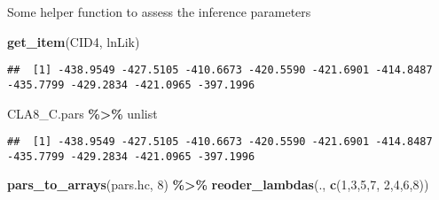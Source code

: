 \documentclass[
]{article}
\newenvironment{Shaded}{\begin{snugshade}}{\end{snugshade}}
\newcommand{\DecValTok}[1]{\textcolor[rgb]{0.00,0.00,0.81}{#1}}
\newcommand{\FunctionTok}[1]{\textcolor[rgb]{0.13,0.29,0.53}{\textbf{#1}}}
\newcommand{\NormalTok}[1]{#1}
\newcommand{\SpecialCharTok}[1]{\textcolor[rgb]{0.81,0.36,0.00}{\textbf{#1}}}
\newcommand{\StringTok}[1]{\textcolor[rgb]{0.31,0.60,0.02}{#1}}
\begin{document}
Some helper function to assess the inference parameters

\begin{Shaded}
\begin{Highlighting}[]
\FunctionTok{get\_item}\NormalTok{(CID4, }\StringTok{\textquotesingle{}lnLik\textquotesingle{}}\NormalTok{)}
\end{Highlighting}
\end{Shaded}

\begin{verbatim}
##  [1] -438.9549 -427.5105 -410.6673 -420.5590 -421.6901 -414.8487 -435.7799 -429.2834 -421.0965 -397.1996
\end{verbatim}

\begin{Shaded}
\begin{Highlighting}[]
\NormalTok{CLA8\_C.pars }\SpecialCharTok{\%\textgreater{}\%}\NormalTok{ unlist}
\end{Highlighting}
\end{Shaded}

\begin{verbatim}
##  [1] -438.9549 -427.5105 -410.6673 -420.5590 -421.6901 -414.8487 -435.7799 -429.2834 -421.0965 -397.1996
\end{verbatim}

\begin{Shaded}
\begin{Highlighting}[]
\FunctionTok{pars\_to\_arrays}\NormalTok{(pars.hc, }\DecValTok{8}\NormalTok{) }\SpecialCharTok{\%\textgreater{}\%} \FunctionTok{reoder\_lambdas}\NormalTok{(., }\FunctionTok{c}\NormalTok{(}\DecValTok{1}\NormalTok{,}\DecValTok{3}\NormalTok{,}\DecValTok{5}\NormalTok{,}\DecValTok{7}\NormalTok{, }\DecValTok{2}\NormalTok{,}\DecValTok{4}\NormalTok{,}\DecValTok{6}\NormalTok{,}\DecValTok{8}\NormalTok{))}
\end{Highlighting}
\end{Shaded}
\end{document}
